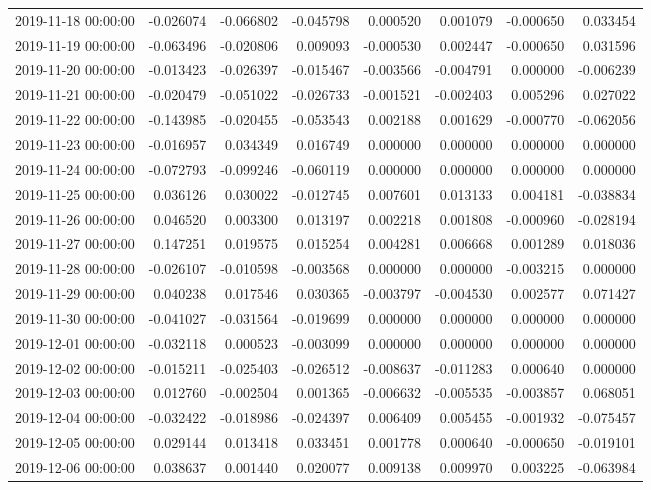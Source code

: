 \begin{tabular}{lrrrrrrr}
2019-11-18 00:00:00 & -0.026074 & -0.066802 & -0.045798 & 0.000520 & 0.001079 & -0.000650 & 0.033454 \\
2019-11-19 00:00:00 & -0.063496 & -0.020806 & 0.009093 & -0.000530 & 0.002447 & -0.000650 & 0.031596 \\
2019-11-20 00:00:00 & -0.013423 & -0.026397 & -0.015467 & -0.003566 & -0.004791 & 0.000000 & -0.006239 \\
2019-11-21 00:00:00 & -0.020479 & -0.051022 & -0.026733 & -0.001521 & -0.002403 & 0.005296 & 0.027022 \\
2019-11-22 00:00:00 & -0.143985 & -0.020455 & -0.053543 & 0.002188 & 0.001629 & -0.000770 & -0.062056 \\
2019-11-23 00:00:00 & -0.016957 & 0.034349 & 0.016749 & 0.000000 & 0.000000 & 0.000000 & 0.000000 \\
2019-11-24 00:00:00 & -0.072793 & -0.099246 & -0.060119 & 0.000000 & 0.000000 & 0.000000 & 0.000000 \\
2019-11-25 00:00:00 & 0.036126 & 0.030022 & -0.012745 & 0.007601 & 0.013133 & 0.004181 & -0.038834 \\
2019-11-26 00:00:00 & 0.046520 & 0.003300 & 0.013197 & 0.002218 & 0.001808 & -0.000960 & -0.028194 \\
2019-11-27 00:00:00 & 0.147251 & 0.019575 & 0.015254 & 0.004281 & 0.006668 & 0.001289 & 0.018036 \\
2019-11-28 00:00:00 & -0.026107 & -0.010598 & -0.003568 & 0.000000 & 0.000000 & -0.003215 & 0.000000 \\
2019-11-29 00:00:00 & 0.040238 & 0.017546 & 0.030365 & -0.003797 & -0.004530 & 0.002577 & 0.071427 \\
2019-11-30 00:00:00 & -0.041027 & -0.031564 & -0.019699 & 0.000000 & 0.000000 & 0.000000 & 0.000000 \\
2019-12-01 00:00:00 & -0.032118 & 0.000523 & -0.003099 & 0.000000 & 0.000000 & 0.000000 & 0.000000 \\
2019-12-02 00:00:00 & -0.015211 & -0.025403 & -0.026512 & -0.008637 & -0.011283 & 0.000640 & 0.000000 \\
2019-12-03 00:00:00 & 0.012760 & -0.002504 & 0.001365 & -0.006632 & -0.005535 & -0.003857 & 0.068051 \\
2019-12-04 00:00:00 & -0.032422 & -0.018986 & -0.024397 & 0.006409 & 0.005455 & -0.001932 & -0.075457 \\
2019-12-05 00:00:00 & 0.029144 & 0.013418 & 0.033451 & 0.001778 & 0.000640 & -0.000650 & -0.019101 \\
2019-12-06 00:00:00 & 0.038637 & 0.001440 & 0.020077 & 0.009138 & 0.009970 & 0.003225 & -0.063984 \\

\end{tabular}
